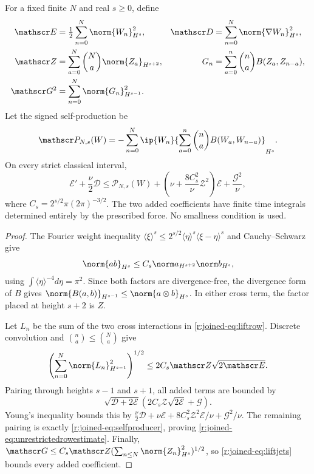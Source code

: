 \begin{theorem}\label{r:joined-thm:lift}
For a fixed finite $N$ and real $s\ge0$, define
\begin{equation}\label{r:joined-eq:liftenergy}
\begin{aligned}
\mathscr E&=\tfrac12\sum_{n=0}^N\norm{W_n}_{H^s}^2,
&\mathscr D&=\sum_{n=0}^N\norm{\nabla W_n}_{H^s}^2,\\
\mathscr Z&=\sum_{a=0}^N\binom Na\norm{Z_a}_{H^{s+2}},
&G_n&=\sum_{a=0}^n\binom na B(Z_a,Z_{n-a}),\\
\mathscr G^2&=\sum_{n=0}^N\norm{G_n}_{H^{s-1}}^2.
\end{aligned}
\end{equation}
Let the signed self-production be
\begin{equation}\label{r:joined-eq:selfproducer}
\mathscr P_{N,s}(W)
=-\sum_{n=0}^N\ip{W_n}{
 \sum_{a=0}^n\binom na B(W_a,W_{n-a})}_{H^s}.
\end{equation}
On every strict classical interval,
\begin{equation}\label{r:joined-eq:unrestrictedrowestimate}
\mathscr E'+\frac\nu2\mathscr D
\le\mathscr P_{N,s}(W)
+\left(\nu+\frac{8C_s^2}{\nu}\mathscr Z^2\right)\mathscr E
+\frac{\mathscr G^2}{\nu},
\end{equation}
where $C_s=2^{s/2}\pi(2\pi)^{-3/2}$. The two added coefficients have finite time integrals determined entirely by the prescribed force. No smallness condition is used.
\end{theorem}
\begin{proof}
The Fourier weight inequality
$\langle\xi\rangle^s\le2^{s/2}\langle\eta\rangle^s
\langle\xi-\eta\rangle^s$
and Cauchy--Schwarz give
\begin{equation*}
\norm{ab}_{H^s}\le C_s\norm a_{H^{s+2}}\norm b_{H^s},
\end{equation*}
using $\int\langle\eta\rangle^{-4}d\eta=\pi^2$.
Since both factors are divergence-free, the divergence form of $B$ gives
$\norm{B(a,b)}_{H^{s-1}}\le\norm{a\otimes b}_{H^s}$.
In either cross term, the factor placed at height $s+2$ is $Z$.

Let $L_n$ be the sum of the two cross interactions in \eqref{r:joined-eq:liftrow}. Discrete convolution and $\binom na\le\binom Na$ give
\begin{equation*}
\left(\sum_{n=0}^N\norm{L_n}_{H^{s-1}}^2\right)^{1/2}
\le2C_s\mathscr Z\sqrt{2\mathscr E}.
\end{equation*}
Pairing through heights $s-1$ and $s+1$, all added terms are bounded by
\begin{equation*}
\sqrt{\mathscr D+2\mathscr E}
\left(2C_s\mathscr Z\sqrt{2\mathscr E}+\mathscr G\right).
\end{equation*}
Young's inequality bounds this by
$\frac\nu2\mathscr D+\nu\mathscr E
+8C_s^2\mathscr Z^2\mathscr E/\nu+\mathscr G^2/\nu$.
The remaining pairing is exactly \eqref{r:joined-eq:selfproducer}, proving
\eqref{r:joined-eq:unrestrictedrowestimate}. Finally,
$\mathscr G\le C_s\mathscr Z(\sum_{n\le N}\norm{Z_n}_{H^s}^2)^{1/2}$,
so \eqref{r:joined-eq:liftjets} bounds every added coefficient.
\end{proof}

